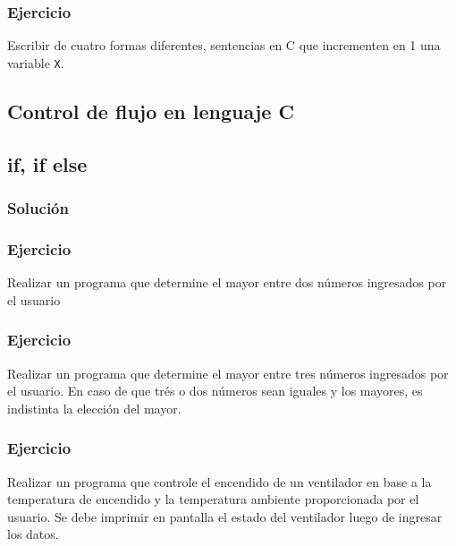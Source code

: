 \subsubsection{Ejercicio}
Escribir de cuatro formas diferentes, sentencias en C que incrementen en 1 una variable \texttt{X}.

\subsection*{Control de flujo en lenguaje C}

\subsection*{if, if else}

\subsubsection{Solución}

\lstset{inputencoding=utf8/latin1}

{\small
  \lstset{inputencoding=utf8/latin1}
  
}

\subsubsection{Ejercicio}
Realizar un programa que determine el mayor entre dos números ingresados por el usuario
{\small
  \lstset{inputencoding=utf8/latin1}
  
}

\subsubsection{Ejercicio}
Realizar un programa que determine el mayor entre tres números ingresados por el usuario. En caso de que trés o dos números sean iguales y los mayores, es indistinta la elección del mayor.
{\small
  \lstset{inputencoding=utf8/latin1}
  
}

\subsubsection{Ejercicio}
Realizar un programa que controle el encendido de un ventilador en base a la temperatura de encendido y la temperatura ambiente proporcionada por el usuario. Se debe imprimir en pantalla el estado del ventilador luego de ingresar los datos.
{\small
  \lstset{inputencoding=utf8/latin1}
  
}

